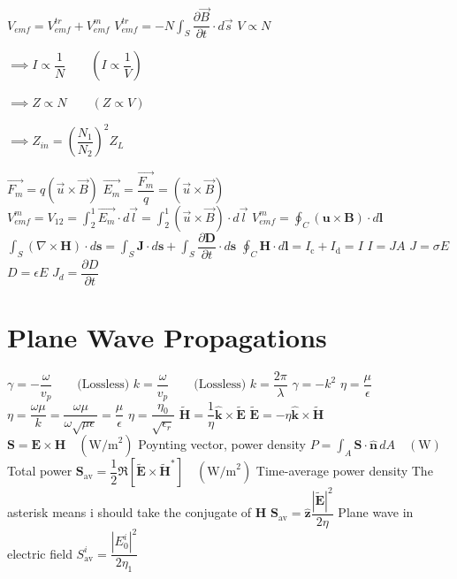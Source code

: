 \documentclass{book}
\begin{document}
\begin{outline}
	\1 $V_{emf} = V^{tr}_{emf} + V^m_{emf}$
	\1 $V^{tr}_{emf} = - N \int_S \dfrac{\partial \vec{B}}{\partial t} \cdot d\vec{s}$
	\1 $V \propto N$

	$\implies I \propto \dfrac{1}{N} \qquad \left( I \propto \dfrac{1}{V} \right)$

	$\implies Z \propto N \qquad \left( Z \propto V \right)$

	$\implies Z_{in} = \left(\dfrac{N_1}{N_2}\right)^2 Z_L$

	\1 $\vec{F_m} = q( \vec{u} \times \vec{B})$
	\1 $\vec{E_m} = \dfrac{\vec{F_m}}{q} = ( \vec{u} \times \vec{B})$
	\1 $V^m_{emf} = V_{12} = \int^1_2 \vec{E_m} \cdot d\vec{l} =  \int^1_2 ( \vec{u} \times \vec{B}) \cdot d\vec{l}$
	\1 $V^m_{emf} = \oint_{C}(\mathbf{u}\times\mathbf{B})\cdot d\mathbf{l}$
	\1 $\int_{S}(\nabla\times\mathbf{H})\cdot d\mathbf{s}=\int_{S}\mathbf{J}\cdot d\mathbf{s}+\int_{S}\dfrac{\partial\mathbf{D}}{\partial t}\cdot d\mathbf{s}$
	\1 $\oint_C\mathbf{H}\cdot d\mathbf{l}=I_\mathrm{c}+I_\mathrm{d}=I$
	\1 $I = JA$
	\1 $J = \sigma E$
	\1 $D = \epsilon E$
	\1 $J_{d}=\dfrac{\partial D}{\partial t}$
\end{outline}

\section*{Plane Wave Propagations}

\begin{outline}
	\1 $\gamma = - \dfrac{\omega}{v_p} \qquad \text{(Lossless)}$
	\1 $k = \dfrac{\omega}{v_p} \qquad \text{(Lossless)}$
	\1 $k = \dfrac{2\pi}{\lambda}$
	\1 $\gamma = - k^2$
	\1 $\eta = \dfrac{\mu}{\epsilon}$
	\2 $\eta = \dfrac{\omega \mu}{k} = \dfrac{\omega \mu}{\omega \sqrt{\mu \epsilon}} = \dfrac{\mu}{\epsilon}$
	\1 $\eta = \dfrac{\eta_0}{\sqrt{\epsilon_r}}$
	\1 $\widetilde{\mathbf{H}}=\dfrac{1}{\eta}\hat{\mathbf{k}}\times\widetilde{\mathbf{E}}$
	\1 $\widetilde{\mathbf{E}}=-\eta\hat{\mathbf{k}}\times\widetilde{\mathbf{H}}$
	\1 $\mathbf{S} = \mathbf{E} \times \mathbf{H} \quad (\text{W/m}^2)$
	\2 Poynting vector, power density
	\1 $P = \int_A \mathbf{S} \cdot \hat{\mathbf{n}} \, dA \quad (\text{W})$
	\2 Total power
	\1 $\mathbf{S}_{\text{av}} = \dfrac{1}{2} \Re \left[ \tilde{\mathbf{E}} \times \tilde{\mathbf{H}}^{*} \right] \quad (\text{W/m}^2)$
	\2 Time-average power density
	\2 The asterisk means i should take the conjugate of \textbf{H}
	\1 $\mathbf{S}_\text{av}=\hat{\mathbf{z}}\dfrac{|\widetilde{\mathbf{E}}|^2}{2\eta}$
	\2 Plane wave in electric field
	\1 $S_{\text{av}}^{i} = \dfrac{\left|E_0^{i}\right|^2}{2\eta_1}$
\end{outline}
\end{document}
